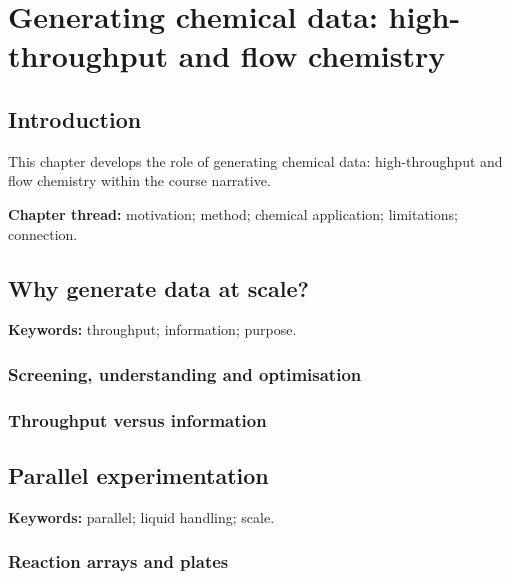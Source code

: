 
\chapter{Generating chemical data: high-throughput and flow chemistry}

\section{Introduction}

This chapter develops the role of generating chemical data: high-throughput and flow chemistry within the course narrative.

\begin{insightbox}
\textbf{Chapter thread:} motivation; method; chemical application; limitations; connection.
\end{insightbox}

\section{Why generate data at scale?}

\begin{conceptbox}
\textbf{Keywords:} throughput; information; purpose.
\end{conceptbox}

\subsection{Screening, understanding and optimisation}


\subsection{Throughput versus information}


\section{Parallel experimentation}

\begin{methodbox}
\textbf{Keywords:} parallel; liquid handling; scale.
\end{methodbox}

\subsection{Reaction arrays and plates}

